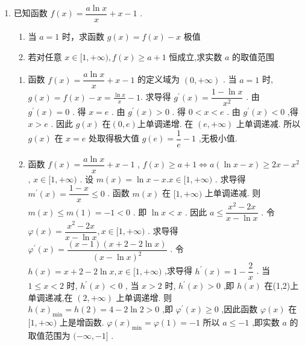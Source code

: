 \begin{enumerate}
    \item 已知函数 $f\left( x\right)  = \dfrac{a\ln x}{x} + x - 1$ .
    \begin{enumerate}
        \item 当 $a = 1$ 时，求函数 $g\left( x\right)  = f\left( x\right)  - x$ 极值
        \item 若对任意 $x \in  \lbrack 1, + \infty ),f\left( x\right)  \geq  a + 1$ 恒成立,求实数 $a$ 的取值范围
    \end{enumerate}
    \begin{jieda}
        \begin{enumerate}
            \item 函数 $f\left( x\right)  = \dfrac{a\ln x}{x} + x - 1$ 的定义域为 $\left( {0, + \infty }\right)$ . 当 $a = 1$ 时, $g\left( x\right)  = f\left( x\right)  - x = \frac{\ln x}{x} - 1$.
            求导得 ${g}^{\prime }\left( x\right)  = \dfrac{1 - \ln x}{{x}^{2}}$ . 由 ${g}^{\prime }\left( x\right)  = 0$ . 得 $x = {e}$ . 由 ${g}^{\prime }\left( x\right)  > 0$ . 得 $0 < x < {e}$ . 由 ${g}^{\prime }\left( x\right)  < 0$ ,得 $x > {e}$ .
            因此 $g\left( x\right)$ 在$(0,e)$上单调递增. 在 $\left( {{e}, + \infty }\right)$ 上单调递减.
            所以 $g\left( x\right)$ 在 $x = {e}$ 处取得极大值 $g\left( {e}\right)  = \dfrac{1}{{e}} - 1$ ,无极小值.
            \item 函数 $f\left( x\right)  = \dfrac{a\ln x}{x} + x - 1$ , $f\left( x\right)  \geq  a + 1 \Longleftrightarrow  a\left( {\ln x - x}\right)  \geq  {2x} - {x}^{2}$ , $x \in  \lbrack 1, + \infty )$ .
            设 $m\left( x\right)  = \ln x - x.x \in  \lbrack 1, + \infty )$ . 求导得 ${m}^{\prime }\left( x\right)  = \dfrac{1 - x}{x} \leq  0$ . 函数 $m\left( x\right)$ 在 $\lbrack 1, + \infty )$ 上单调递减.
            则 $m\left( x\right)  \leq  m\left( 1\right)  =  - 1 < 0$ . 即 $\ln x < x$ . 因此 $a \leq  \dfrac{{x}^{2} - {2x}}{x - \ln x}$ .
            令 $\varphi \left( x\right)  = \dfrac{{x}^{2} - {2x}}{x - \ln x},x \in  \lbrack 1, + \infty )$ . 求导得 ${\varphi }^{\prime }\left( x\right)  = \dfrac{\left( {x - 1}\right) \left( {x + 2 - 2\ln x}\right) }{{\left( x - \ln x\right) }^{2}}$ .
            令 $h\left( x\right)  = x + 2 - 2\ln x,x \in  \lbrack 1, + \infty )$ ,求导得 ${h}^{\prime }\left( x\right)  = 1 - \dfrac{2}{x}$ . 当 $1 \leq  x < 2$ 时, ${h}^{\prime }\left( x\right)  < 0$ ,
            当 $x > 2$ 时, ${h}^{\prime }\left( x\right)  > 0$ ,即 $h\left( x\right)$ 在(1,2)上单调递减,在 $\left( {2, + \infty }\right)$ 上单调递增.
            则 $h{\left( x\right) }_{\min } = h\left( 2\right)  = 4 - 2\ln 2 > 0$ ,即 ${\varphi }^{\prime }\left( x\right)  \geq  0$ ,因此函数 $\varphi \left( x\right)$ 在 $\lbrack 1, + \infty )$ 上是增函数.
            $\varphi {\left( x\right) }_{\min } = \varphi \left( 1\right)  =  - 1$
            所以 $a \leq   - 1$ ,即实数 $a$ 的取值范围为 $( - \infty , - 1\rbrack$ .
        \end{enumerate}
    \end{jieda}
    

\end{enumerate}
